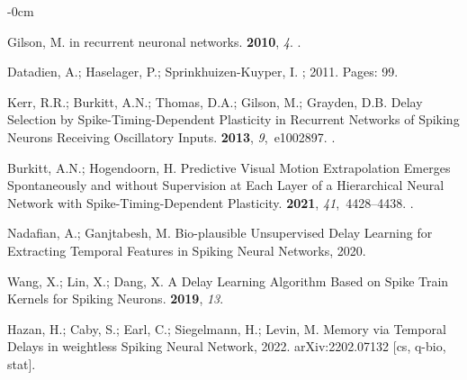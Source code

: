 \documentclass[brainsci, %
               review,submit,pdftex,moreauthors
               ]{Definitions/mdpi}
\begin{document}
\begin{adjustwidth}{-\extralength}{0cm}
\begin{thebibliography}{999}
  Gilson, M.
   in recurrent neuronal networks.
   {\bf 2010}, {\em 4}.
  .
  
  Datadien, A.; Haselager, P.; Sprinkhuizen-Kuyper, I.
  ;  2011.
  \newblock Pages: 99.
  
  Kerr, R.R.; Burkitt, A.N.; Thomas, D.A.; Gilson, M.; Grayden, D.B.
  \newblock Delay {Selection} by {Spike}-{Timing}-{Dependent} {Plasticity} in
    {Recurrent} {Networks} of {Spiking} {Neurons} {Receiving} {Oscillatory}
    {Inputs}.
   {\bf 2013}, {\em 9},~e1002897.
  .
  
  Burkitt, A.N.; Hogendoorn, H.
  \newblock Predictive {Visual} {Motion} {Extrapolation} {Emerges}
    {Spontaneously} and without {Supervision} at {Each} {Layer} of a
    {Hierarchical} {Neural} {Network} with {Spike}-{Timing}-{Dependent}
    {Plasticity}.
   {\bf 2021}, {\em 41},~4428--4438.
  .
  
  Nadafian, A.; Ganjtabesh, M.
  \newblock Bio-plausible {Unsupervised} {Delay} {Learning} for {Extracting}
    {Temporal} {Features} in {Spiking} {Neural} {Networks},  2020.
  
  Wang, X.; Lin, X.; Dang, X.
  \newblock A {Delay} {Learning} {Algorithm} {Based} on {Spike} {Train} {Kernels}
    for {Spiking} {Neurons}.
   {\bf 2019}, {\em 13}.
  
  Hazan, H.; Caby, S.; Earl, C.; Siegelmann, H.; Levin, M.
  \newblock Memory via {Temporal} {Delays} in weightless {Spiking} {Neural}
    {Network},  2022.
  \newblock arXiv:2202.07132 [cs, q-bio, stat].
  

\end{thebibliography}
\end{adjustwidth}
\end{document}
